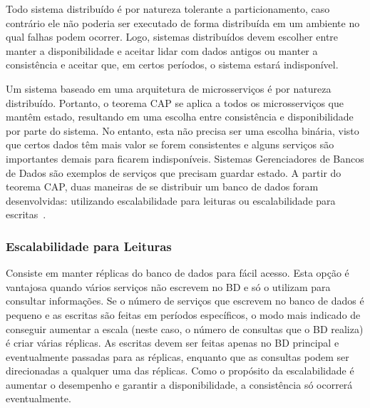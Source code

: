 Todo sistema distribuído é por natureza tolerante a particionamento, caso contrário ele não poderia ser executado de forma distribuída em um ambiente no qual falhas podem ocorrer. Logo, sistemas distribuídos devem escolher entre manter a disponibilidade e aceitar lidar com dados antigos ou manter a consistência e aceitar que, em certos períodos, o sistema estará indisponível. 

Um sistema baseado em uma arquitetura de microsserviços é por natureza distribuído. Portanto, o teorema CAP se aplica a todos os microsserviços que mantêm estado, resultando em uma escolha entre consistência e disponibilidade por parte do sistema. No entanto, esta não precisa ser uma escolha binária, visto que certos dados têm mais valor se forem consistentes e alguns serviços são importantes demais para ficarem indisponíveis. Sistemas Gerenciadores de Bancos de Dados são exemplos de serviços que precisam guardar estado. A partir do teorema CAP, duas maneiras de se distribuir um banco de dados foram desenvolvidas: utilizando escalabilidade para leituras ou escalabilidade para escritas~\citep{databasescalability}.


\subsubsection{\textbf{Escalabilidade para Leituras}}
Consiste em manter réplicas do banco de dados para fácil acesso. Esta opção é vantajosa quando vários serviços não escrevem no BD e só o utilizam para consultar informações. Se o número de serviços que escrevem no banco de dados é pequeno e as escritas são feitas em períodos específicos, o modo mais indicado de conseguir aumentar a escala (neste caso, o número de consultas que o BD realiza) é criar várias réplicas. As escritas devem ser feitas apenas no BD principal e eventualmente passadas para as réplicas, enquanto que as consultas podem ser direcionadas a qualquer uma das réplicas. Como o propósito da escalabilidade é aumentar o desempenho e garantir a disponibilidade, a consistência só ocorrerá eventualmente. 


